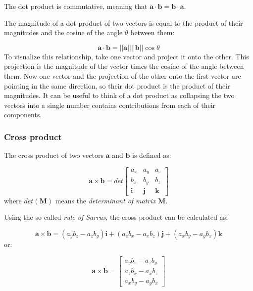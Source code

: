 \documentclass[12pt]{article}
\numberwithin{equation}{section}
\numberwithin{figure}{section}
\numberwithin{table}{section}
\begin{document}
The dot product is commutative, meaning that
$\mathbf{a} \cdot \mathbf{b} = \mathbf{b} \cdot \mathbf{a}$.

The magnitude of a dot product of two vectors is equal to the product of their
magnitudes and the cosine of the angle $\theta$ between them:

\begin{equation}
  \mathbf{a} \cdot \mathbf{b} = ||\mathbf{a}|| ||\mathbf{b}|| \cos{\theta}
\end{equation}
To visualize this relationship, take one vector and project it onto the other.
This projection is the magnitude of the vector times the cosine of the angle
between them.
Now one vector and the projection of the other onto the first vector are
pointing in the same direction, so their dot product is the product of their
magnitudes.
It can be useful to think of a dot product as collapsing the two vectors into a
single number contains contributions from each of their components.

\subsubsection{Cross product}

The cross product of two vectors $\mathbf{a}$ and
$\mathbf{b}$ is defined as:

\begin{equation}
  \mathbf{a} \times \mathbf{b} =
  det \begin{bmatrix}
    a_x & a_y & a_z \\
    b_x & b_y & b_z \\
    \mathbf{i} & \mathbf{j} & \mathbf{k}
  \end{bmatrix}
\end{equation}
where $det(\mathbf{M})$ means the \textit{determinant of matrix $\mathbf{M}$}.

Using the so-called \textit{rule of Sarrus}, the cross product can be calculated
as:

\begin{equation}
  \mathbf{a} \times \mathbf{b} = (a_y b_z - a_z b_y) \mathbf{i} +
    (a_z b_x - a_x b_z) \mathbf{j} + (a_x b_y - a_y b_x) \mathbf{k}
\end{equation}
or:

\begin{equation}
  \mathbf{a} \times \mathbf{b} =
    \begin{bmatrix}
      a_y b_z - a_z b_y \\
      a_z b_x - a_x b_z \\
      a_x b_y - a_y b_x
    \end{bmatrix}
\end{equation}
\end{document}
